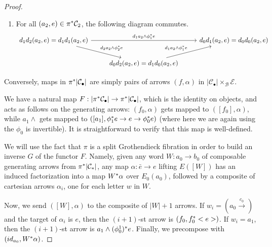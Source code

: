 \documentclass[a4paper,10pt
,draft
]{article}%
\renewcommand{\1}{\eta}%
\begin{document}
\begin{proof}
{\begin{enumerate}[label = (\roman*)]
        \item For all $(a_2, e) \in \pi^{\**} \mathcal C_2$, the following diagram commutes.
              \begin{equation}
                    \begin{tikzcd}
                          d_1 d_2 (a_2, e) = d_1 d_1 (a_2, e) \arrow[rr, "d_1 a_2 \wedge \phi_1^{\**} e"] \arrow[dr, "d_2 a_2 \wedge \phi_2^{\**} e"]
                          &&
                          d_0 d_1(a_2, e) = d_0 d_0(a_2, e)
                          \\
                          &
                          d_0 d_2 (a_2, e) = d_1 d_0 (a_2, e) \arrow[ur, "d_1 a_2 \wedge \phi_1^{\**} e"]
                    \end{tikzcd}
              \end{equation}
        \end{enumerate}
      }

      Conversely, maps in $\pi^{\**}|\mathcal C_\bullet|$ are simply pairs of arrows $(f, \alpha)$ in $|\mathcal C_\bullet| \times_{\mathcal B} \mathcal E$.

      We have a natural map $F: |\pi^{\**} \mathcal C_\bullet| \to \pi^{\**} |\mathcal C_\bullet|$, which is the identity on objects,
      and acts as follows on the generating arrows:
      $(f_0, \alpha)$ gets mapped to $([f_0], \alpha)$, while
      $a_1 \wedge $ gets mapped to $([a_1], \phi_1^{\**} e \to e \to \phi_0^{\**} e)$
      (where here we are again using the $\phi_0$ is invertible).
      It is straightforward to verify that this map is well-defined.      

      We will use the fact that $\pi$ is a split Grothendieck fibration in order to build an inverse $G$ of the functor $F$.
      Namely, given any word $W: a_0 \to b_0$ of composable generating arrows from $\pi^{\**}|\mathcal C_{\**}|$,
      any map $\alpha: \bar e \to e$ lifting $E([W])$ has an induced factorization into
      a map $W^{\**}\alpha$ over $E_0(a_0)$, followed by a composite of cartesian arrows $\alpha_i$, one for each letter $w$ in $W$.

      Now, we send $([W],\alpha)$ to the composite of $|W|+1$ arrows.
      If $w_i = (a_0 \xrightarrow{c_0})$ and the target of $\alpha_i$ is $e$, then the $(i+1)$-st arrow is $(f_0, f_0^{\**}<e>)$.
      If $w_i = a_1$, then the $(i+1)$-st arrow is $a_1 \wedge (\phi_0^{\-1})^{\**} e$.
      Finally, we precompose with $(id_{a_0}, W^{\**}\alpha)$.


\end{proof}
\end{document}
